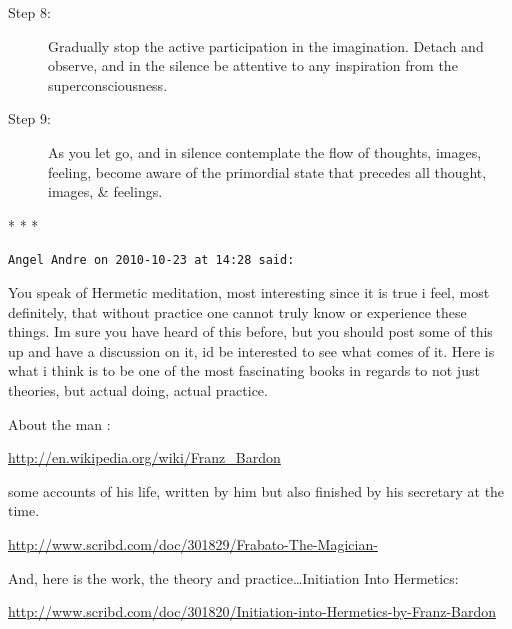 \begin{description}
\item[Step 8: ]

Gradually stop the active participation in the imagination. Detach and observe, and in the silence be attentive to any inspiration from the superconsciousness. 

\item[Step 9: ]

As you let go, and in silence contemplate the flow of thoughts, images, feeling, become aware of the primordial state that precedes all thought, images, \& feelings. 

\end{description}



\begin{center}* * *\end{center}

\begin{footnotesize}\begin{sffamily}



\texttt{Angel Andre on 2010-10-23 at 14:28 said: }

You speak of Hermetic meditation, most interesting since it is true i feel, most definitely, that without practice one cannot truly know or experience these things. Im sure you have heard of this before, but you should post some of this up and have a discussion on it, id be interested to see what comes of it. Here is what i think is to be one of the most fascinating books in regards to not just theories, but actual doing, actual practice. 

About the man :

\url{http://en.wikipedia.org/wiki/Franz\_Bardon}

some accounts of his life, written by him but also finished by his secretary at the time.

\url{http://www.scribd.com/doc/301829/Frabato-The-Magician-}

And, here is the work, the theory and practice…Initiation Into Hermetics:

\url{http://www.scribd.com/doc/301820/Initiation-into-Hermetics-by-Franz-Bardon}


\end{sffamily}\end{footnotesize}

